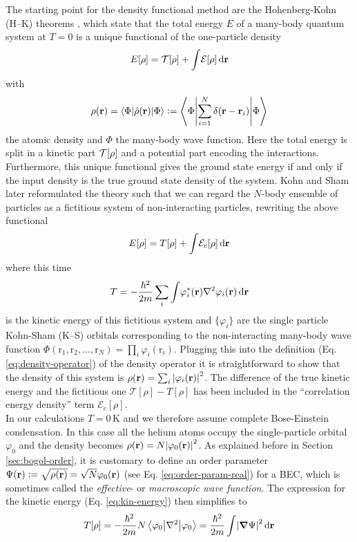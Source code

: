 \documentclass[12pt,a4paper,twosides]{book}
\renewcommand{\vec}[1]{\bm{\mathrm{#1}}}
\newcommand{\unit}[1]{\,\mathrm{#1}}
\newcommand{\diff}[1]{\,\mathrm{d}{\vec{#1}}}
\begin{document}
	The starting point for the density functional method are the Hohenberg-Kohn (H--K) theorems \cite{Hoh64}, which state that the total energy $E$ of a many-body quantum system at $T=0$ is a unique functional of the one-particle density
	\begin{align}
		E[\rho] = {\cal T}[\rho] +\int\!{\cal E}[\rho]\diff{r} \label{eq1}
	\end{align}
	with
	\begin{align}\label{eq:density-operator}
		\rho({\mathbf r})= \ev**{\hat\rho(\vec{r})}{\Phi} \vcentcolon= \ev**{\sum _{i=1}^{N}\delta({\mathbf r}-{\mathbf r}_i)}{\Phi}
	\end{align}
	the atomic density and $\Phi$ the many-body wave function. Here the total energy is split in a kinetic part ${\cal T}[\rho]$ and a potential part encoding the interactions. Furthermore, this unique functional gives the ground state energy if and only if the input density is the true ground state density of the system. Kohn and Sham later reformulated the theory such that we can regard the $N$-body ensemble of particles as a fictitious system of non-interacting particles, rewriting the above functional 
	\begin{equation}
		E[\rho] = T[\rho] + \int\!{\cal E}_c[\rho]\diff{r} \label{eq:ks-tot-energy}
	\end{equation}
	where this time
	\begin{equation}
		T= -\frac{\hbar^2}{2m} \sum_i \int\! \varphi_i^*({\mathbf r})\laplacian \varphi_i({\mathbf r})\diff{r} \label{eq:kin-energy}
	\end{equation}
	is the kinetic energy of this fictitious system and $\{\varphi_i\}$ are the single particle Kohn-Sham (K--S) orbitals corresponding to the non-interacting many-body wave function $\Phi(\vec{r}_1,\vec{r}_2,\ldots,\vec{r}_N)=\prod_i\varphi_i(\vec{r}_i)$. Plugging this into the definition (Eq. \ref{eq:density-operator}) of the density operator it is straightforward to show that the density of this system is $\rho(\vec{r})=\sum_i\absolutevalue{\varphi_i(\vec{r})}^2$. The difference of the true kinetic energy and the fictitious one $\mathcal{T}[\rho]-T[\rho]$ has been included in the ``correlation energy density'' term $\mathcal{E}_c[\rho]$.\\
	
	In our calculations $T=0\unit{K}$ and we therefore assume complete Bose-Einstein condensation. In this case all the helium atoms occupy the single-particle orbital $\varphi_0$ and the density becomes $\rho(\vec{r})=N\absolutevalue{\varphi_0(\vec{r})}^2$. As explained before in Section \ref{sec:bogol-order}, it is customary to define an order parameter $\Psi(\vec{r})\vcentcolon=\sqrt{\rho(\vec{r})}=\sqrt{N}\varphi_0(\vec{r})$ (see Eq. \ref{eq:order-param-real}) for a BEC, which is sometimes called the \emph{effective}- or \emph{macroscopic wave function}. The expression for the kinetic energy (Eq. \ref{eq:kin-energy}) then simplifies to
	\begin{align}
		T[\rho] =
		-\frac{\hbar^2}{2m} N \ev**{\laplacian}{\varphi_0} = \frac{\hbar^2}{2m} \int\! \abs{\grad{\Psi}}^2\diff{r} \label{eq5}
	\end{align}
	
\end{document}
